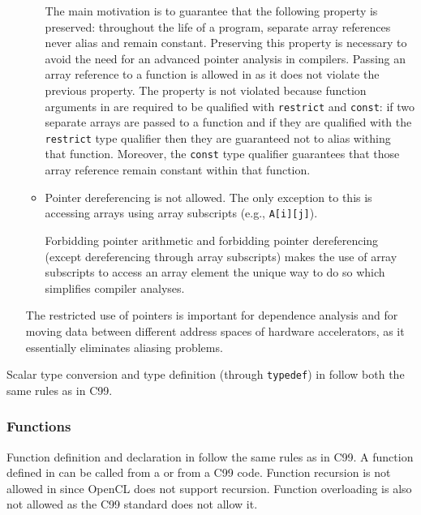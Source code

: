 \begin{itemize}
\begin{itemize}
      The main motivation is to guarantee that the following property is
      preserved:
      throughout the life of a \pencil program, separate array references
      never alias and remain constant.
      Preserving this property is necessary to avoid the need for an
      advanced pointer
      analysis in \pencil compilers.
      Passing an array reference to a function is allowed in \pencil as it does not violate the previous
      property.  The property is not violated because function arguments in \pencil are required to be
      qualified with \lstinline!restrict! and \lstinline!const!:
      if two separate arrays are passed to a function and if they
      are qualified with the
      \lstinline!restrict! type qualifier then they are guaranteed
      not to alias withing that function.
      Moreover, the \lstinline!const! type qualifier guarantees
      that those array reference remain constant within that function.

    \item Pointer dereferencing is not allowed.  The only exception to
      this is accessing arrays using array subscripts
      (e.g., \lstinline!A[i][j]!).

      Forbidding pointer arithmetic and forbidding pointer dereferencing
      (except dereferencing through array subscripts) makes the use of
      array subscripts to access an array element the unique way to do so
      which simplifies compiler analyses.
  \end{itemize}
    The restricted use of pointers is important for dependence analysis and
    for moving data between
    different address spaces of hardware accelerators, as it essentially
    eliminates aliasing problems.
 \end{itemize}

Scalar type conversion and type definition (through \lstinline!typedef!) in \pencil
follow both the same rules as in C99.

\subsubsection{Functions}
Function definition and declaration in \pencil follow the same
rules as in C99.
A function defined in \pencil can be called from a \pencil
or from a C99 code.
Function recursion is not allowed in \pencil since OpenCL does
not support recursion.
Function overloading is also not allowed as the C99 standard
does not allow it.



